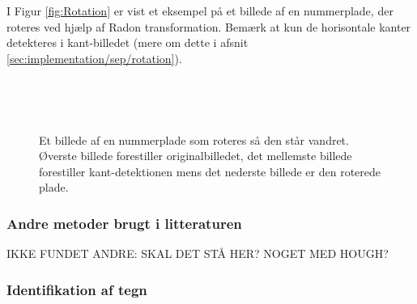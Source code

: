 I Figur \vref{fig:Rotation} er vist et eksempel på et billede af en nummerplade, der roteres ved hjælp af Radon transformation. Bemærk at kun de horisontale kanter detekteres i kant-billedet (mere om dette i afsnit \vref{sec:implementation/sep/rotation}).

\begin{figure}[htp]
  \centering
  \begin{minipage}[c]{6 cm}
  \end{minipage}\\
  \begin{minipage}[c]{6 cm}
  \end{minipage}\\
  \begin{minipage}[c]{6 cm}
  \end{minipage}
  \caption{Et billede af en nummerplade som roteres så den står vandret. Øverste billede forestiller originalbilledet, det mellemste billede forestiller kant-detektionen mens det nederste billede er den roterede plade.}
  \label{fig:Rotation}
\end{figure}


\subsubsection*{Andre metoder brugt i litteraturen}

IKKE FUNDET ANDRE: SKAL DET STÅ HER? NOGET MED HOUGH?

\subsubsection{Identifikation af tegn}


